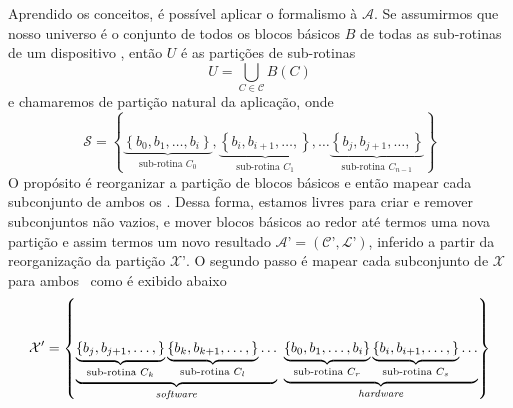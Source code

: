          Aprendido os conceitos, é possível aplicar o formalismo à $ \mathcal{A} $.
         Se assumirmos que nosso universo é o conjunto de todos os blocos básicos $B$ de todas as sub-rotinas de um dispositivo \wearable, então $U$ é as partições de sub-rotinas
         \begin{equation}
            U = \bigcup_{C \in \mathcal{C}} B(C) \label{eq:bigcup}
         \end{equation}
         e chamaremos de partição natural da aplicação, onde
         \begin{equation}
            \mathcal{S}  = \left \{
            \underbrace{\left \{ b_0, b_1, \dots, b_i \right \}}_{\text{sub-rotina }C_0},
            \underbrace{\left \{ b_i, b_{i+1}, \dots, \right \}}_{\text{sub-rotina }C_1},\dots
            \underbrace{\left \{ b_j, b_{j+1}, \dots, \right \}}_{\text{sub-rotina }C_{n-1}}
            \right \}
         \end{equation}
         O propósito é reorganizar a partição de blocos básicos e então mapear cada subconjunto de ambos os \hs.
         Dessa forma, estamos livres para criar e remover subconjuntos não vazios, e mover blocos básicos ao redor até termos uma nova partição e assim termos um novo resultado $ \mathcal{A}’ = (\mathcal{C}’, \mathcal{L}’) $, inferido a partir da reorganização da partição $ \mathcal{X}’ $.
         O segundo passo é mapear cada subconjunto de $ \mathcal{X} $ para ambos \hs\ como é exibido abaixo
         \begin{equation}
            \mathcal{X}'   = \left \{
            \underbrace{
               \underbrace{
                  \left \{ b_j, b_{j+1}, \dots, \right \}
               }_{\text{sub-rotina }C_k}
               \underbrace{
                  \left \{ b_k, b_{k+1}, \dots, \right \}
               }_{\text{sub-rotina }C_l}
               \dots
            }_{\text{\textit{software}}}
            \
            \underbrace{
               \underbrace{
                  \left \{ b_0, b_1, \dots, b_i \right \}
               }_{\text{sub-rotina }C_r}
               \underbrace{
                  \left \{ b_i, b_{i+1}, \dots, \right \}
               }_{\text{sub-rotina }C_s}
               \dots
            }_{\text{\textit{hardware}}}
            \right \} \label{eq:part_final}
         \end{equation}


